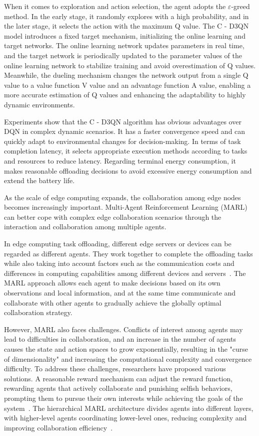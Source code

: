 \documentclass[journal]{IEEEtran}
\begin{document}
When it comes to exploration and action selection, the agent adopts the $\varepsilon$-greed method. In the early 
stage, it randomly explores with a high probability, and in the later stage, it selects the action 
with the maximum Q value. The C - D3QN model introduces a fixed target mechanism, initializing the 
online learning and target networks. The online learning network updates parameters in real time, and 
the target network is periodically updated to the parameter values of the online learning network to stabilize training and avoid overestimation of Q values. Meanwhile, the dueling mechanism changes the network output from a single Q value to a value function V value and an advantage function A value, enabling a more accurate estimation of Q values and enhancing the adaptability to highly dynamic environments.

Experiments show that the C - D3QN algorithm has obvious advantages over DQN in complex dynamic scenarios. It has a faster convergence speed and can quickly adapt to environmental changes for decision-making. In terms of task completion latency, it selects appropriate execution methods according to tasks and resources to reduce latency. Regarding terminal energy consumption, it makes reasonable offloading decisions to avoid excessive energy consumption and extend the battery life.

As the scale of edge computing expands, the collaboration among edge nodes becomes increasingly important. Multi-Agent Reinforcement Learning (MARL) can better cope with complex edge collaboration scenarios through the interaction and collaboration among multiple agents.

In edge computing task offloading, different edge servers or devices can be regarded as different agents. They work together to complete the offloading tasks while also taking into account factors such as the communication costs and differences in computing capabilities among different devices and servers~\cite{zheng08}. The MARL approach allows each agent to make decisions based on its own observations and local information, and at the same time communicate and collaborate with other agents to gradually achieve the globally optimal collaboration strategy.

However, MARL also faces challenges. Conflicts of interest among agents may lead to difficulties in collaboration, and an increase in the number of agents causes the state and action spaces to grow exponentially, resulting in the "curse of dimensionality" and increasing the computational complexity and convergence difficulty. To address these challenges, researchers have proposed various solutions. A reasonable reward mechanism can adjust the reward function, rewarding agents that actively collaborate and punishing selfish behaviors, prompting them to pursue their own interests while achieving the goals of the system~\cite{zheng09}. The hierarchical MARL architecture divides agents into different layers, with higher-level agents coordinating lower-level ones, reducing complexity and improving collaboration efficiency~\cite{zheng10}.
\end{document}

